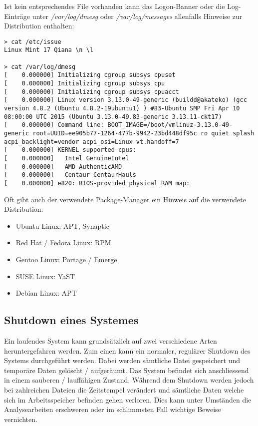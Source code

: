 Ist kein entsprechendes File vorhanden kann das Logon-Banner oder die Log-Einträge unter \textit{/var/log/dmesg} oder \textit{/var/log/messages} allenfalls Hinweise zur Distribution enthalten:\\
\begin{lstlisting}
> cat /etc/issue
Linux Mint 17 Qiana \n \l

> cat /var/log/dmesg
[    0.000000] Initializing cgroup subsys cpuset
[    0.000000] Initializing cgroup subsys cpu
[    0.000000] Initializing cgroup subsys cpuacct
[    0.000000] Linux version 3.13.0-49-generic (buildd@akateko) (gcc version 4.8.2 (Ubuntu 4.8.2-19ubuntu1) ) #83-Ubuntu SMP Fri Apr 10 08:00:00 UTC 2015 (Ubuntu 3.13.0-49.83-generic 3.13.11-ckt17)
[    0.000000] Command line: BOOT_IMAGE=/boot/vmlinuz-3.13.0-49-generic root=UUID=ee905b77-1264-477b-9942-23bd448df95c ro quiet splash acpi_backlight=vendor acpi_osi=Linux vt.handoff=7
[    0.000000] KERNEL supported cpus:
[    0.000000]   Intel GenuineIntel
[    0.000000]   AMD AuthenticAMD
[    0.000000]   Centaur CentaurHauls
[    0.000000] e820: BIOS-provided physical RAM map:
\end{lstlisting}

Oft gibt auch der verwendete Package-Manager ein Hinweis auf die verwendete Distribution:
\begin{itemize}
\item Ubuntu Linux: APT, Synaptic
\item Red Hat / Fedora Linux: RPM
\item Gentoo Linux: Portage / Emerge
\item SUSE Linux: YaST
\item Debian Linux: APT
\end{itemize}



\subsection{Shutdown eines Systemes}
Ein laufendes System kann grundsätzlich auf zwei verschiedene Arten heruntergefahren werden. Zum einen kann ein normaler, regulärer Shutdown des Systems durchgeführt werden. Dabei werden sämtliche Datei gespeichert und temporäre Daten gelöscht / aufgeräumt. Das System befindet sich anschliessend in einem sauberen / lauffähigen Zustand. Während dem Shutdown werden jedoch bei zahlreichen Dateien die Zeitstempel verändert und sämtliche Daten welche sich im Arbeitsspeicher befinden gehen verloren. Dies kann unter Umständen die Analysearbeiten erschweren oder im schlimmsten Fall wichtige Beweise vernichten.

